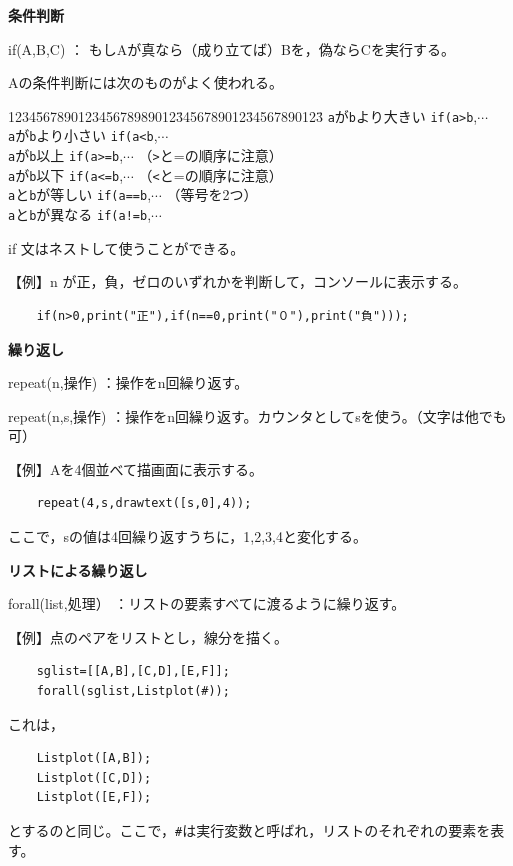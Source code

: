 \documentclass[papersize,a4paper,12pt,uplatex]{jsarticle}
\begin{document}
\vspace{\baselineskip}\noindent
{\bf 条件判断}

if(A,B,C)  ： もしAが真なら（成り立てば）Bを，偽ならCを実行する。

Aの条件判断には次のものがよく使われる。
 \begin{tabbing}
1234\=56789012345678989012\=3456789012\=34567890123\=\kill
 \>  \verb|a|が\verb|b|より大きい \> \verb|if(a>b|,$\cdots$\\
 \>  \verb|a|が\verb|b|より小さい \> \verb|if(a<b|,$\cdots$\\
 \>  \verb|a|が\verb|b|以上  \> \verb|if(a>=b|,$\cdots$ （\verb|>|と=の順序に注意）\\
 \>  \verb|a|が\verb|b|以下  \> \verb|if(a<=b|,$\cdots$ （\verb|<|と=の順序に注意）\\
 \>  \verb|a|と\verb|b|が等しい \>  \verb|if(a==b|,$\cdots$ （等号を2つ）\\
 \>  \verb|a|と\verb|b|が異なる \> \verb|if(a!=b|,$\cdots$\\
\end{tabbing}

if 文はネストして使うことができる。

\vspace{\baselineskip}
  【例】n が正，負，ゼロのいずれかを判断して，コンソールに表示する。
\begin{verbatim}
    if(n>0,print("正"),if(n==0,print("０"),print("負")));
\end{verbatim}

\vspace{\baselineskip}\noindent
{\bf 繰り返し}

repeat(n,操作)    ：操作をn回繰り返す。

repeat(n,s,操作)  ：操作をn回繰り返す。カウンタとしてsを使う。（文字は他でも可）

\vspace{\baselineskip}
  【例】Aを4個並べて描画面に表示する。
\begin{verbatim}
    repeat(4,s,drawtext([s,0],4));
\end{verbatim}
  ここで，sの値は4回繰り返すうちに，1,2,3,4と変化する。

\vspace{\baselineskip}\noindent
{\bf リストによる繰り返し}

  forall(list,処理）  ：リストの要素すべてに渡るように繰り返す。
  
\vspace{\baselineskip}
  【例】点のペアをリストとし，線分を描く。
\begin{verbatim}
    sglist=[[A,B],[C,D],[E,F]];
    forall(sglist,Listplot(#));
\end{verbatim}
  これは，
\begin{verbatim}
    Listplot([A,B]);
    Listplot([C,D]);
    Listplot([E,F]);
\end{verbatim}
とするのと同じ。ここで，\verb|#|は実行変数と呼ばれ，リストのそれぞれの要素を表す。
\end{document}
